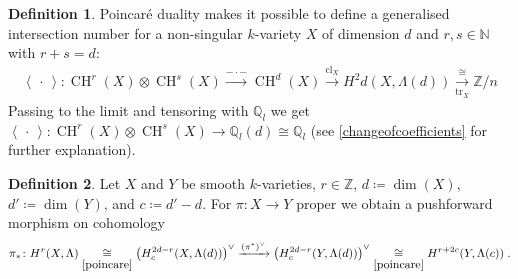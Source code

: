 \documentclass[english,headsepline=0.25pt]{scrartcl}
\theoremstyle{definition}
\newtheorem{Def}{Definition}[section]
\newtheorem{Cor}[Def]{Corollary}
\theoremstyle{remark}
\newcommand*{\N}{\mathds{N}}
\newcommand*{\Z}{\mathds{Z}}
\newcommand*{\Q}{\mathds{Q}}
\newcommand*{\Zmod}[1]{\Z/#1} %
\newcommand*{\Zl}{\Z_l} %
\newcommand*{\Ql}{\Q_l} %
\newcommand*{\Tr}{\text{tr}} %
\newcommand*{\intProd}[2]{{#1\cdot#2}} %
\newcommand*{\intNum}[1]{{\left\langle{#1}\right\rangle}} %
\DeclareMathOperator{\CH}{CH} %
\DeclareMathOperator{\CL}{cl} %
\begin{document}
\begin{Def}
  Poincaré duality makes it possible to define a generalised
  intersection number for a non-singular $k$-variety $X$
  of dimension $d$ and $r,s\in\N$ with $r+s=d$:
  \begin{gather*}
    \intNum{\,\cdot\,}\colon
    \CH^r(X)\otimes\CH^s(X)
    \xrightarrow{\intProd{-}{-}} \CH^{d}(X)
    \xrightarrow{\CL_X} H^2d(X,\Lambda(d))
    \xrightarrow[\Tr_X]{\cong} \Zmod{n}
  \end{gather*}
  Passing to the limit and tensoring with $\Ql$ we get
  $\intNum{\,\cdot\,}\colon\CH^r(X)\otimes\CH^s(X)\to\Ql(d)\cong\Ql$
  (see \ref{changeofcoefficients} for further explanation).
\end{Def}



\begin{Def}\label{def:pushforward}
  Let $X$ and $Y$ be smooth $k$-varieties, $r\in\Z$,
  $d\coloneqq\dim(X)$, $d'\coloneqq\dim(Y)$, and $c\coloneqq d'-d$.
  For $\pi\colon X\to Y$ proper we obtain a pushforward morphism on
  cohomology
  \begin{gather*}
    \pi_*\colon
    H^r(X,\Lambda)
    \underset{\ref{poincare}}\cong
    \left(H_c^{2d-r}(X,\Lambda(d))\right)^\vee
    \xrightarrow{(\pi^*)^\vee}
    \left(H_c^{2d-r}(Y,\Lambda(d))\right)^\vee
    \underset{\ref{poincare}}\cong
    H^{r+2c}(Y,\Lambda(c))
    \;.
  \end{gather*}
\end{Def}
\end{document}
